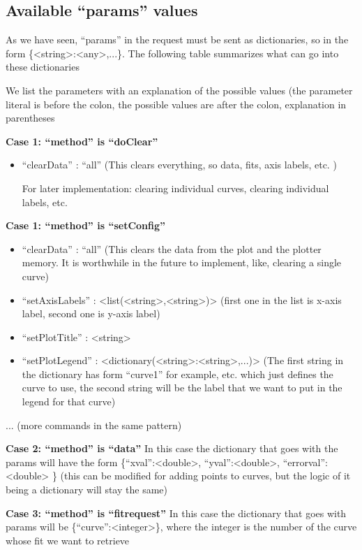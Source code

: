 \documentclass[11pt]{article} %
\begin{document}
\subsection{Available ``params'' values}

As we have seen, ``params'' in the request must be sent as dictionaries, so in the form \{<string>:<any>,...\}. The following table summarizes what can go into these dictionaries

\begin{tcolorbox}[title=Sending ``params'' to the server]

We list the parameters with an explanation of the possible values (the parameter literal is before the colon, the possible values are after the colon, explanation in parentheses

\textbf{Case 1: ``method'' is ``doClear''}
\begin{itemize}
\item ``clearData'' : ``all'' (This clears everything, so data, fits, axis labels, etc. )

For later implementation: clearing individual curves, clearing individual labels, etc.
\end{itemize}
\textbf{Case 1: ``method'' is ``setConfig''}
\begin{itemize}
\item ``clearData'' : ``all'' (This clears the data from the plot and the plotter memory. It is worthwhile in the future to implement, like, clearing a single curve)
\item ``setAxisLabels'' : <list(<string>,<string>)> (first one in the list is x-axis label, second one is y-axis label)
\item ``setPlotTitle'' : <string>
\item ``setPlotLegend'' : <dictionary(<string>:<string>,...)> (The first string in the dictionary has form ``curve1'' for example, etc. which just defines the curve to use, the second string will be the label that we want to put in the legend for that curve)
\end{itemize}
... (more commands in the same pattern)

\textbf{Case 2: ``method'' is ``data''}
In this case the dictionary that goes with the params will have the form \{``xval'':<double>, ``yval'':<double>, ``errorval'': <double> \}
(this can be modified for adding points to curves, but the logic of it being a dictionary will stay the same)

\textbf{Case 3: ``method'' is ``fitrequest''}
In this case the dictionary that goes with params will be \{``curve'':<integer>\}, where the integer is the number of the curve whose fit we want to retrieve


\end{tcolorbox}
\end{document}
